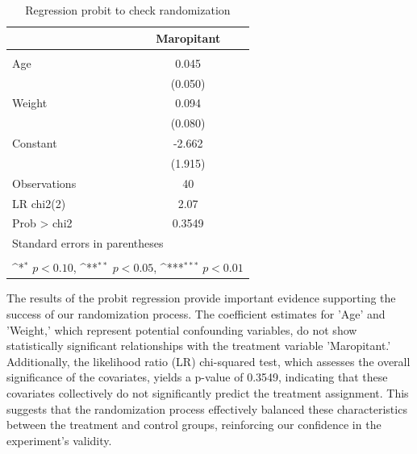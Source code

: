 \documentclass{article}
\newcommand{\sym}[1]{%
  \ifmmode^{#1}\else\(^{#1}\)\fi%
}
\begin{document}
\begin{table}[!h]\centering
    \def\sym#1{\ifmmode^{#1}\else\(^{#1}\)\fi}
    \caption{Regression probit to check randomization}
    \begin{tabular}{l*{1}{c}}
    \toprule
     
                        &\multicolumn{1}{c}{Maropitant}\\
    \midrule
        &                     \\
    Age                 &       0.045         \\
                        &     (0.050)         \\
    \addlinespace
    Weight                &       0.094         \\
                        &     (0.080)         \\
    \addlinespace
    Constant            &      -2.662         \\
                        &     (1.915)         \\
    \midrule
    Observations        &          40         \\
    LR chi2(2)          &      2.07             \\
    Prob > chi2         &   0.3549              \\

    \bottomrule
    \multicolumn{2}{l}{\footnotesize Standard errors in parentheses}\\
    \multicolumn{2}{l}{\footnotesize  }\\
    \multicolumn{2}{l}{\footnotesize \sym{*} \(p<0.10\), \sym{**} \(p<0.05\), \sym{***} \(p<0.01\)}\\
    \end{tabular}
\end{table}
    
The results of the probit regression provide important evidence supporting the success of our randomization process. The
coefficient estimates for 'Age' and 'Weight,' which represent potential confounding variables, do not show statistically
significant relationships with the treatment variable 'Maropitant.' Additionally, the likelihood ratio (LR) chi-squared
test, which assesses the overall significance of the covariates, yields a p-value of 0.3549, indicating that these
covariates collectively do not significantly predict the treatment assignment. This suggests that the randomization
process effectively balanced these characteristics between the treatment and control groups, reinforcing our confidence
in the experiment's validity. 
\end{document}
